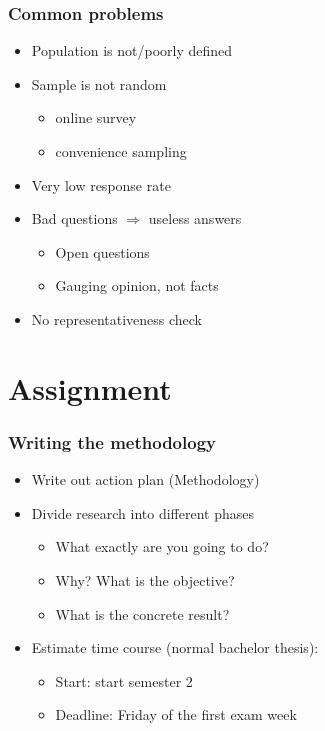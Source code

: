 \documentclass[aspectratio=169]{beamer}
\begin{document}
\begin{frame}
  \frametitle{Common problems}

 \begin{itemize}
     \item Population is not/poorly defined
     \item Sample is not random
     \begin{itemize}
         \item online survey
         \item convenience sampling
     \end{itemize}
     \item Very low response rate
     \item Bad questions $\Rightarrow$ useless answers
     \begin{itemize}
         \item Open questions
         \item Gauging opinion, not facts
     \end{itemize}
     \item No representativeness check
 \end{itemize}

\end{frame}

\section{Assignment}

\begin{frame}
  \frametitle{Writing the methodology}

  \begin{itemize}
      \item Write out action plan (Methodology)
      \item Divide research into different phases
      \begin{itemize}
          \item What exactly are you going to do?
          \item Why? What is the objective?
          \item What is the concrete result?
      \end{itemize}
      \item Estimate time course (normal bachelor thesis):
      \begin{itemize}
          \item Start: start semester 2
          \item Deadline: Friday of the first exam week
      \end{itemize}
  \end{itemize}

\end{frame}
\end{document}
